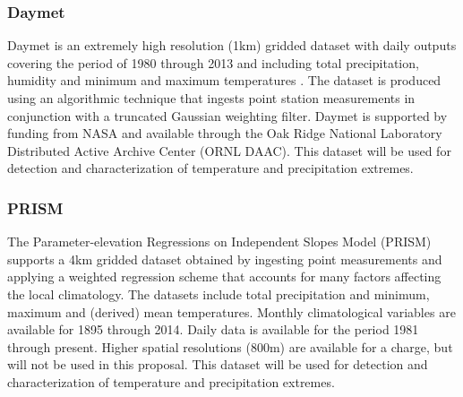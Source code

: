 \documentclass[11pt]{article}
\newcommand\citep{\cite}
\begin{document}
\subsubsection*{Daymet} \label{sec:DAYMET}

Daymet is an extremely high resolution (1km) gridded dataset with daily outputs covering the period of 1980 through 2013 and including total precipitation, humidity and minimum and maximum temperatures \citep{thornton1997generating, thornton1999improved, thornton2000simultaneous}.  The dataset is produced using an algorithmic technique that ingests point station measurements in conjunction with a truncated Gaussian weighting filter.  Daymet is supported by funding from NASA and available through the Oak Ridge National Laboratory Distributed Active Archive Center (ORNL DAAC).  This dataset will be used for detection and characterization of temperature and precipitation extremes.

\subsubsection*{PRISM} \label{sec:PRISM}

The Parameter-elevation Regressions on Independent Slopes Model (PRISM) \citep{daly2008physiographically} supports a 4km gridded dataset obtained by ingesting point measurements and applying a weighted regression scheme that accounts for many factors affecting the local climatology.  The datasets include total precipitation and minimum, maximum and (derived) mean temperatures.  Monthly climatological variables are available for 1895 through 2014.  Daily data is available for the period 1981 through present.  Higher spatial resolutions (800m) are available for a charge, but will not be used in this proposal.  This dataset will be used for detection and characterization of temperature and precipitation extremes.



\end{document}
